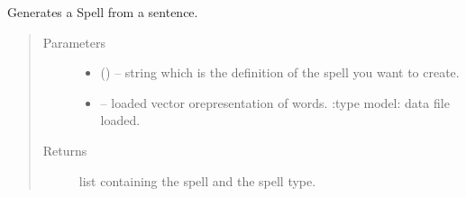 \documentclass[letterpaper,10pt,english]{sphinxmanual}
\begin{document}
\begin{fulllineitems}
\label{\detokenize{code:hp_spells.generateSpell}}
Generates a Spell from a sentence.
\begin{quote}\begin{description}
\item[{Parameters}] \leavevmode\begin{itemize}
\item {} 
 () -- string which is the definition of the spell you want to create.

\item {} 
 -- loaded vector orepresentation of words.
:type model: data file loaded.

\end{itemize}

\item[{Returns}] \leavevmode
list containing the spell and the spell type.

\end{description}\end{quote}

\end{fulllineitems}

\end{document}
